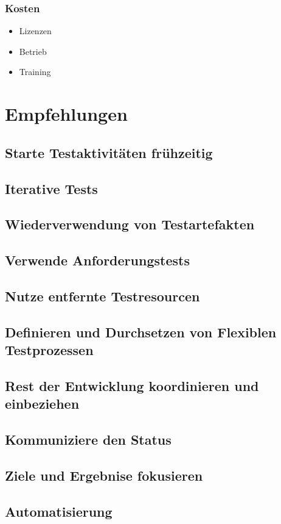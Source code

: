 \subsection{Kosten}
\begin{itemize}
	\item Lizenzen
	\item Betrieb
	\item Training
\end{itemize}

\chapter{Empfehlungen}
\section{Starte Testaktivit\"aten fr\"uhzeitig}
\section{Iterative Tests}
\section{Wiederverwendung von Testartefakten}
\section{Verwende Anforderungstests}
\section{Nutze entfernte Testresourcen}
\section{Definieren und Durchsetzen von Flexiblen Testprozessen}
\section{Rest der Entwicklung koordinieren und einbeziehen}
\section{Kommuniziere den Status}
\section{Ziele und Ergebnise fokusieren}
\section{Automatisierung}